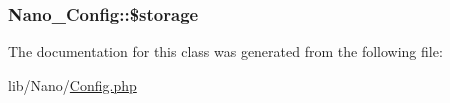 \hypertarget{classNano__Config_802966f82c86ebde44ec49cec9264164}{
\subsubsection[{\$storage}]{\setlength{\rightskip}{0pt plus 5cm}Nano\_\-Config::\$storage}}
\label{classNano__Config_802966f82c86ebde44ec49cec9264164}




The documentation for this class was generated from the following file:\begin{CompactItemize}
\item 
lib/Nano/\hyperlink{Config_8php}{Config.php}\end{CompactItemize}
